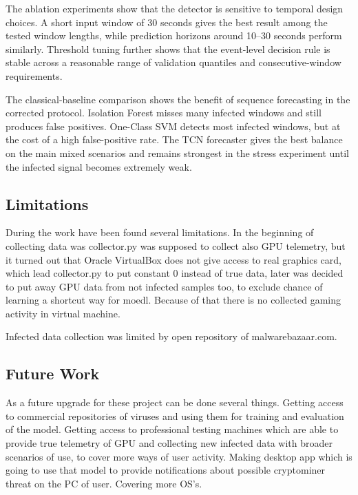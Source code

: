 \documentclass[a4paper,12pt]{extarticle}
\begin{document}
The ablation experiments show that the detector is sensitive to temporal design choices. A short input window of 30 seconds gives the best result among the tested window lengths, while prediction horizons around 10--30 seconds perform similarly. Threshold tuning further shows that the event-level decision rule is stable across a reasonable range of validation quantiles and consecutive-window requirements.

The classical-baseline comparison shows the benefit of sequence forecasting in the corrected protocol. Isolation Forest misses many infected windows and still produces false positives. One-Class SVM detects most infected windows, but at the cost of a high false-positive rate. The TCN forecaster gives the best balance on the main mixed scenarios and remains strongest in the stress experiment until the infected signal becomes extremely weak.

\subsection{Limitations}

During the work have been found several limitations. In the beginning of collecting data was collector.py was supposed to collect also GPU telemetry, but it turned out that Oracle VirtualBox does not give access to real graphics card, which lead collector.py to put constant 0 instead of true data, later was decided to put away GPU data from not infected samples too, to exclude chance of learning a shortcut way for moedl. Because of that there is no collected gaming activity in virtual machine.

Infected data collection was limited by open repository of malwarebazaar.com.

\subsection{Future Work}

As a future upgrade for these project can be done several things. Getting access to commercial repositories of viruses and using them  for training and evaluation of the model. Getting access to professional testing machines which are able to provide true telemetry of GPU and collecting new infected data with broader scenarios of use, to cover more ways of user activity. Making desktop app which is going to use that model to provide notifications about possible cryptominer threat on the PC of user. Covering more OS's.
\end{document}
